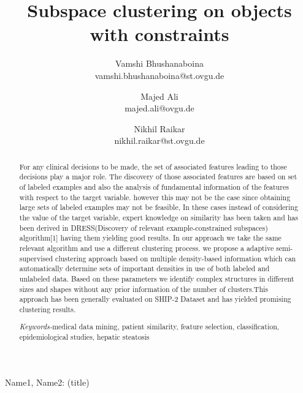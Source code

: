 \documentclass[10pt, conference, compsocconf]{IEEEtran}
\title{Subspace clustering on objects with constraints}
\author {Vamshi Bhushanaboina \\  {vamshi.bhushanaboina@st.ovgu.de} 
   \and Majed Ali  \\ {majed.ali@ovgu.de} 
   \and Nikhil Raikar \\ {nikhil.raikar@st.ovgu.de}}
\begin{document}
\maketitle
\markboth{}%
{{Name1, Name2}: (title)}
\IEEEtitleabstractindextext


\begin{abstract}
For any clinical decisions to be made, the set of associated features leading to those decisions play a major role. The discovery of those associated features are based on set of labeled examples and also the analysis of fundamental information of the features with  respect to the target variable. however this may not be the case since obtaining large sets of labeled examples may not be feasible, In these cases instead of considering the value of the target variable, expert knowledge on similarity has been taken and has been derived in 
DRESS(Discovery of relevant example-constrained subspaces) algorithm[1] having them yielding good results. In our approach we take the same relevant algorithm and use a different clustering process. we propose a adaptive semi-supervised clustering approach based on multiple density-based information which can automatically determine sets of important densities in use of both labeled and unlabeled data. Based on these parameters we identify complex structures in different sizes and shapes without any prior information of the number of clusters.This approach has been generally evaluated on SHIP-2 Dataset and has yielded promising clustering results.

\textit{Keywords-}medical data mining, patient similarity, feature selection,
classification, epidemiological studies, hepatic steatosis
\end{abstract}
\IEEEdisplaynontitleabstractindextext
\end{document}
